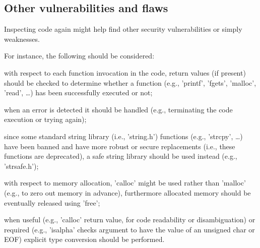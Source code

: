 \subsection{Other vulnerabilities and flaws}
Inspecting code again might help find other security vulnerabilities or simply weaknesses.

For instance, the following should be considered:
\begin{description}[itemsep=1.5pt]
    \item[return value checking:] with respect to each function invocation in the code, return values (if present) should be checked to determine whether a function (e.g., 'printf', 'fgets', 'malloc'\parencite{malloc}, 'read', \ldots) has been successfully executed or not;
    \item[exit in case of error:] when an error is detected it should be handled (e.g., terminating the code execution or trying again);
    \item[unsafe string library usage:] since some standard string library (i.e., 'string.h'\parencite{string.h}) functions (e.g., 'strcpy', \ldots) have been banned and have more robust or secure replacements (i.e., these functions are deprecated), a safe string library should be used instead (e.g., 'strsafe.h'\parencite{strsafe.h});
    \item[memory management:] with respect to memory allocation, 'calloc'\parencite{calloc} might be used rather than 'malloc' (e.g., to zero out memory in advance), furthermore allocated memory should be eventually released using 'free'\parencite{free};
    \item[explicit type casting:] when useful (e.g., 'calloc' return value, for code readability or disambiguation) or required (e.g., 'isalpha'\parencite{isalpha} checks argument to have the value of an
       unsigned char or EOF) explicit type conversion should be performed.
\end{description}
